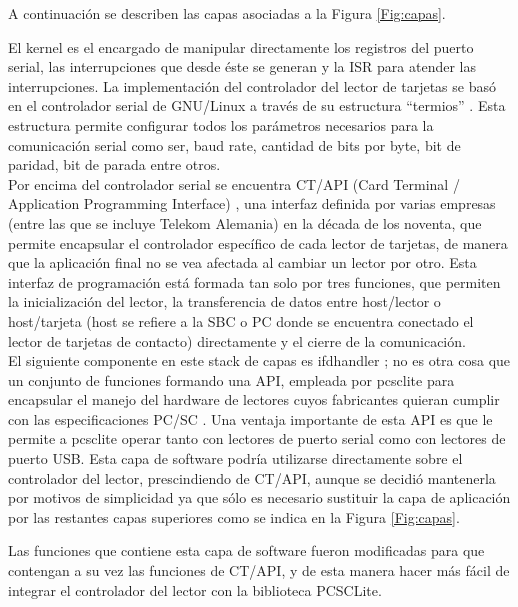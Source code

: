 \documentclass[%
        final,
        notitlepage,
        narroweqnarray,
        inline,
        ]{ieee}
\begin{document}
A continuación se describen las capas asociadas a la Figura \ref{Fig:capas}.

\bigskip
{}
El kernel es el encargado de manipular directamente los registros del puerto serial, las interrupciones que desde éste se generan y la ISR para atender las interrupciones.
La implementación del controlador del lector de tarjetas se basó en el controlador serial de GNU/Linux a través de su estructura “termios” \cite{termios}. Esta estructura permite configurar todos los parámetros necesarios para la comunicación serial como ser, baud rate, cantidad de bits por byte, bit de paridad, bit de parada entre otros. \\


Por encima del controlador serial se encuentra CT/API (Card Terminal / Application Programming Interface) \cite{ctapi}, una interfaz definida por varias empresas (entre las que se incluye Telekom Alemania) en la década de los noventa, que permite encapsular el controlador específico de cada lector de tarjetas, de manera que la aplicación final no se vea afectada al cambiar un lector por otro.
Esta interfaz de programación está formada tan solo por tres funciones, que permiten la inicialización del lector, la transferencia de datos entre host/lector o host/tarjeta (host se refiere a la SBC o PC donde se encuentra conectado el lector de tarjetas de contacto) directamente y el cierre de la comunicación.\\


El siguiente componente en este stack de capas es ifdhandler \cite{ifdhandler}; no es otra cosa que un conjunto de funciones formando una API, empleada por pcsclite \cite{pcsclite} para encapsular el manejo del hardware de lectores cuyos fabricantes quieran cumplir con las especificaciones PC/SC \cite{pcsclite_esp}. Una ventaja importante de esta API es que le permite a pcsclite operar tanto con lectores de puerto serial como con lectores de puerto USB.
Esta capa de software podría utilizarse directamente sobre el controlador del lector, prescindiendo de CT/API, aunque se decidió mantenerla por motivos de simplicidad ya que sólo es necesario sustituir la capa de aplicación por las restantes capas superiores como se indica en la Figura \ref{Fig:capas}.


Las funciones que contiene esta capa de software fueron modificadas para que contengan a su vez las funciones de CT/API, y de esta manera hacer más fácil de integrar el controlador del lector con la biblioteca PCSCLite.\\
\end{document}
